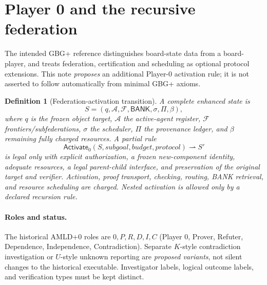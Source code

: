 \documentclass[11pt,letterpaper]{article}
\newtheorem{definition}{Definition}[section]
\theoremstyle{remark}
\newcommand{\BANK}{\mathsf{BANK}}
\newcommand{\Act}{\mathsf{Activate}_0}
\begin{document}
\section{Player 0 and the recursive federation}
The intended GBG+ reference \cite{gbg} distinguishes board-state data from a board-player, and treats federation, certification and scheduling as optional protocol extensions. This note \emph{proposes} an additional Player-0 activation rule; it is not asserted to follow automatically from minimal GBG+ axioms.
\begin{definition}[Federation-activation transition]
A complete enhanced state is
\[S=(q,\mathcal A,\mathcal F,\BANK,\sigma,\Pi,\beta),\]
where $q$ is the frozen object target, $\mathcal A$ the active-agent register, $\mathcal F$ frontiers/subfederations, $\sigma$ the scheduler, $\Pi$ the provenance ledger, and $\beta$ remaining fully charged resources. A partial rule
\[\Act(S,\mathit{subgoal},\mathit{budget},\mathit{protocol})\rightharpoonup S'\]
is legal only with explicit authorization, a frozen new-component identity, adequate resources, a legal parent-child interface, and preservation of the original target and verifier. Activation, proof transport, checking, routing, BANK retrieval, and resource scheduling are charged. Nested activation is allowed only by a declared recursion rule.
\end{definition}
\paragraph{Roles and status.} The historical AMLD+0 roles are $0,P,R,D,I,C$ (Player 0, Prover, Refuter, Dependence, Independence, Contradiction). Separate $K$-style contradiction investigation or $U$-style unknown reporting are \emph{proposed variants}, not silent changes to the historical executable. Investigator labels, logical outcome labels, and verification types must be kept distinct.
\end{document}
